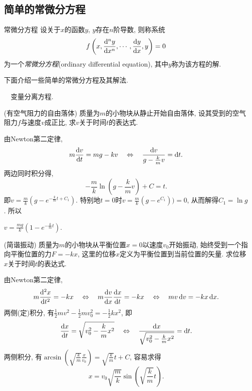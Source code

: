 \subsection{简单的常微分方程}

\begin{definition}{常微分方程}
	设关于$x$的函数$y$, $y$存在$n$阶导数, 则称系统$$f\left( x,\frac{\mathop{}\!\mathrm{d} ^n y}{\mathop{}\!\mathrm{d} x^n},\cdots ,\frac{\mathop{}\!\mathrm{d} y}{\mathop{}\!\mathrm{d} x},y \right)=0$$
	为一个\textit{常微分方程}(ordinary differential equation), 其中$y$称为该方程的解. 
\end{definition}

下面介绍一些简单的常微分方程及其解法. 

~~变量分离方程. 

\begin{example}
	(有空气阻力的自由落体) 质量为$m$的小物块从静止开始自由落体, 设其受到的空气阻力$f$与速度$v$成正比, 求$v$关于时间$t$的表达式. 
\end{example}
\begin{solution}
	由Newton第二定律, $$m \frac{\mathop{}\!\mathrm{d} v}{\mathop{}\!\mathrm{d} t} =mg-kv \quad \Leftrightarrow \quad \frac{\mathop{}\!\mathrm{d} v}{g-\frac{k}{m} v} = \mathop{}\!\mathrm{d} t.$$
	两边同时积分得, $$-\frac{m}{k} \ln \left(g-\frac{k}{m}v \right)+C=t.$$
	即$v=\frac{m}{k}(g-e^{-\frac{k}{m}t+C_1})$. 特别地$t=0$时$v=\frac{m}{k}(g-e^{C_1}))=0$, 从而解得$C_1=\ln g$. 所以
	\begin{center}
		$\displaystyle v = \frac{mg}{k}(1-e^{-\frac{k}{m}t}).$
	\end{center}
\end{solution}

\begin{example}
	(简谐振动) 质量为$m$的小物块从平衡位置$x=0$以速度$v_0$开始振动, 始终受到一个指向平衡位置的力$F=-kx$, 这里的位移$x$定义为平衡位置到当前位置的矢量. 求位移$x$关于时间$t$的表达式. 
\end{example}
\begin{solution}
	由Newton第二定律, $$m \frac{\dif ^2x}{\dif t^2} = -kx \quad \Leftrightarrow \quad m \frac{\dif v}{\dif x} \frac{\dif x}{\dif t} = -kx \quad \Leftrightarrow \quad mv\dif v=-kx\dif x.$$
	两侧(定)积分, 有$\frac{1}{2}mv^2-\frac{1}{2}mv_0^2 = -\frac{1}{2}kx^2$, 即$$\frac{\mathop{}\!\mathrm{d} x}{\mathop{}\!\mathrm{d} t} = \sqrt{v_0^2-\frac{k}{m}x^2} \quad \Leftrightarrow \quad \frac{\mathop{}\!\mathrm{d} x}{\sqrt{v_0^2-\frac{k}{m}x^2}} = \mathop{}\!\mathrm{d} t.$$
	两侧积分, 有$\arcsin (\sqrt{\frac{k}{m}} \frac{x}{v_0}) = \sqrt{\frac{k}{m}} t+C$, 容易求得$$x = v_0\sqrt{\frac{m}{k}}\sin \left( \sqrt{\frac{k}{m}}t \right).$$
\end{solution}

